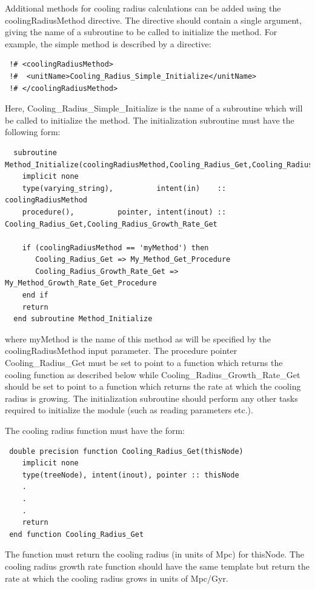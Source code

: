 Additional methods for cooling radius calculations can be added using the {\normalfont \ttfamily coolingRadiusMethod} directive. The directive should contain a single argument, giving the name of a subroutine to be called to initialize the method. For example, the {\normalfont \ttfamily simple} method is described by a directive:
\begin{verbatim}
 !# <coolingRadiusMethod>
 !#  <unitName>Cooling_Radius_Simple_Initialize</unitName>
 !# </coolingRadiusMethod>
\end{verbatim}
Here, {\normalfont \ttfamily Cooling\_Radius\_Simple\_Initialize} is the name of a subroutine which will be called to initialize the method. The initialization subroutine must have the following form:
\begin{verbatim}
  subroutine Method_Initialize(coolingRadiusMethod,Cooling_Radius_Get,Cooling_Radius_Growth_Rate_Get)
    implicit none
    type(varying_string),          intent(in)    :: coolingRadiusMethod
    procedure(),          pointer, intent(inout) :: Cooling_Radius_Get,Cooling_Radius_Growth_Rate_Get
    
    if (coolingRadiusMethod == 'myMethod') then
       Cooling_Radius_Get => My_Method_Get_Procedure
       Cooling_Radius_Growth_Rate_Get => My_Method_Growth_Rate_Get_Procedure
    end if
    return
  end subroutine Method_Initialize
\end{verbatim}
where {\normalfont \ttfamily myMethod} is the name of this method as will be specified by the {\normalfont \ttfamily coolingRadiusMethod} input parameter. The procedure pointer {\normalfont \ttfamily Cooling\_Radius\_Get} must be set to point to a function which returns the cooling function as described below while {\normalfont \ttfamily Cooling\_Radius\_Growth\_Rate\_Get} should be set to point to a function which returns the rate at which the cooling radius is growing. The initialization subroutine should perform any other tasks required to initialize the module (such as reading parameters etc.).

The cooling radius function must have the form:
\begin{verbatim}
 double precision function Cooling_Radius_Get(thisNode)
    implicit none
    type(treeNode), intent(inout), pointer :: thisNode
    .
    .
    .
    return
 end function Cooling_Radius_Get
\end{verbatim}
The function must return the cooling radius (in units of Mpc) for {\normalfont \ttfamily thisNode}. The cooling radius growth rate function should have the same template but return the rate at which the cooling radius grows in units of Mpc/Gyr.

